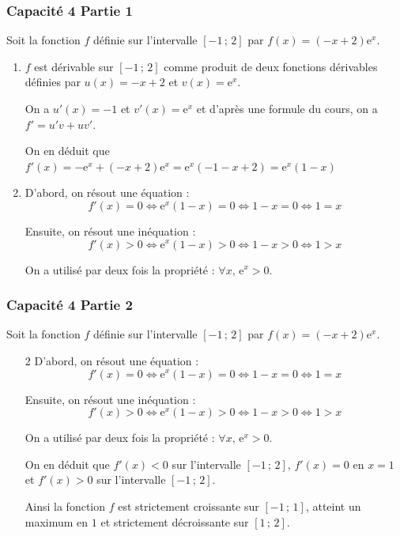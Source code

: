 \documentclass[11pt, hyperref={urlcolor=red,%
            linkcolor=blue, %
            colorlinks=true}]{beamer}
\newcommand{\Interff}[2]{\left[#1\, ;\, #2\right]}
\begin{document}
\begin{frame}
\frametitle{Capacité 4 Partie 1}

Soit la fonction $f$ définie sur l'intervalle $\Interff{-1}{2}$ par $f(x)=(-x+2)\text{e}^{x}$.

\begin{enumerate}
	\item $f$ est dérivable sur $\Interff{-1}{2}$ comme produit de deux fonctions dérivables définies par  $u(x)=-x+2$  et $v(x)=\text{e}^{x}$.
	
	On a $u'(x)=-1$ et $v'(x)=\text{e}^{x}$ et d'après une formule du cours, on a $f'=u'v+uv'$.
	
	On en déduit que $f'(x)=-\text{e}^{x} + (-x+2)\text{e}^{x}=\text{e}^{x}(-1-x+2)=\text{e}^{x}(1-x)$
	
\item D'abord, on résout une équation :
$$f'(x)=0 \Longleftrightarrow \text{e}^{x}(1-x) = 0 \Longleftrightarrow 1 - x = 0 \Longleftrightarrow 1 = x$$

Ensuite, on résout une inéquation :
$$f'(x)>0 \Longleftrightarrow \text{e}^{x}(1-x)> 0 \Longleftrightarrow 1 - x > 0 \Longleftrightarrow 1 > x$$

On a utilisé par deux fois la propriété : $\forall x, \, \text{e}^{x}>0$.

\end{enumerate}
\end{frame}


\begin{frame}
\frametitle{Capacité 4 Partie 2}

Soit la fonction $f$ définie sur l'intervalle $\Interff{-1}{2}$ par $f(x)=(-x+2)\text{e}^{x}$.

\begin{enumerate}

	
\item[2] D'abord, on résout une équation :
$$f'(x)=0 \Longleftrightarrow \text{e}^{x}(1-x) = 0 \Longleftrightarrow 1 - x = 0 \Longleftrightarrow 1 = x$$

Ensuite, on résout une inéquation :
$$f'(x)>0 \Longleftrightarrow \text{e}^{x}(1-x)> 0 \Longleftrightarrow 1 - x > 0 \Longleftrightarrow 1 > x$$

On a utilisé par deux fois la propriété : $\forall x, \, \text{e}^{x}>0$.

On en déduit que $f'(x)<0$ sur l'intervalle $\Interff{-1}{2}$, $f'(x)=0$ en $x=1$ et $f'(x)>0$ sur l'intervalle $\Interff{-1}{2}$.

Ainsi la fonction $f$ est strictement croissante sur $\Interff{-1}{1}$, atteint un maximum en $1$ et strictement décroissante sur $\Interff{1}{2}$.
\end{enumerate}
\end{frame}
\end{document}
